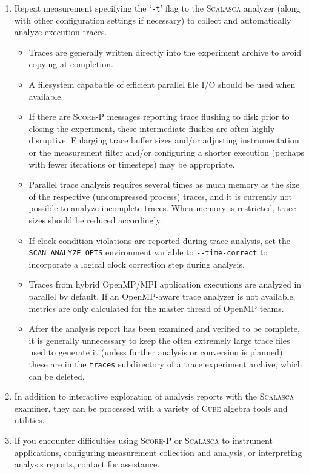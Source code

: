\documentclass[a4paper]{article}
\newcommand{\Scalasca}{\textsc{Scalasca}\xspace}
\newcommand{\Scorep}{\textsc{Score-P}\xspace}
\newcommand{\Cube}{\textsc{Cube}\xspace}
\begin{document}
\begin{enumerate}
\item Repeat measurement specifying the `\verb+-t+' flag to the
\Scalasca analyzer (along with other configuration settings if
necessary) to collect and automatically analyze execution traces.

\begin{itemize}
\item Traces are generally written directly into the experiment archive to
avoid copying at completion. 
\item A filesystem capabable of efficient parallel file I/O should be used when available.
\item If there are \Scorep messages reporting trace flushing to disk prior to
closing the experiment, these intermediate flushes are often highly
disruptive.  
Enlarging trace buffer sizes and/or adjusting
instrumentation or the measurement filter and/or configuring a shorter
execution (perhaps with fewer iterations or timesteps) may be appropriate.
\item Parallel trace analysis requires several times as much memory as the
size of the respective (uncompressed process) traces, and it is currently not
possible to analyze incomplete traces.  When memory is restricted,
trace sizes should be reduced accordingly.
\item If clock condition violations are reported during trace
analysis, set the \verb+SCAN_ANALYZE_OPTS+ environment variable to
\verb+--time-correct+ to incorporate a logical clock correction step during
analysis.
\item Traces from hybrid OpenMP/MPI application executions are analyzed
in parallel by default.  If an OpenMP-aware trace analyzer is not available,
metrics are only calculated for the master thread of OpenMP teams.
\item After the analysis report has been examined and verified to be
complete, it is generally unnecessary to keep the often extremely large
trace files used to generate it (unless further analysis or conversion
is planned): these are in the \verb+traces+
subdirectory of a trace experiment archive, which can be deleted.
\end{itemize}

\item In addition to interactive exploration of analysis reports with
the \Scalasca examiner, they can be processed with a variety of
\Cube algebra tools and utilities.

\item If you encounter difficulties using \Scorep or \Scalasca to instrument applications,
configuring measurement collection and analysis, or interpreting
analysis reports, contact \texttt{\PackageBugreport} for assistance.

\end{enumerate}
\end{document}
